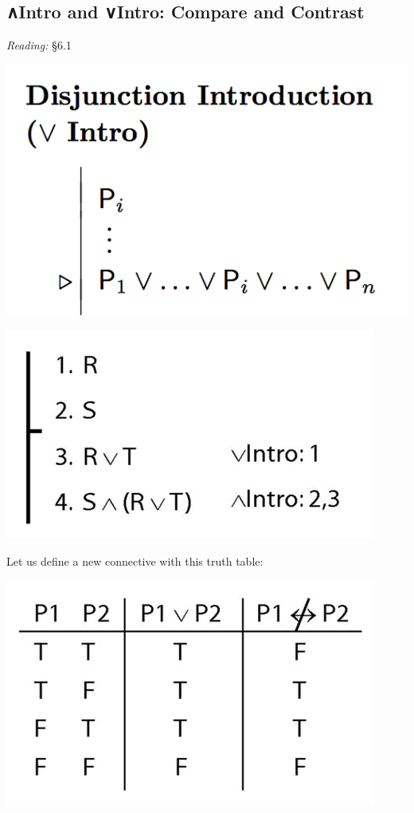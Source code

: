 \documentclass[12pt]{extarticle}
\begin{document}
\begin{multicols*}{3}
 
\section{∧Intro and ∨Intro: Compare and Contrast}
 
\emph{Reading:} §6.1
 
\begin{center}
\includegraphics[scale=0.3]{img/rule_disjunction_intro.png}
\end{center}
\begin{center}
\includegraphics[scale=0.3]{img/proof_unit_212}
\end{center}
\begin{minipage}{\columnwidth}
 
Let us define a new connective with this truth table:
 
\begin{center}
\includegraphics[scale=0.3]{img/tt_not_equivalent.png}
\end{center}
\end{minipage}
 

\end{multicols*}
\end{document}
